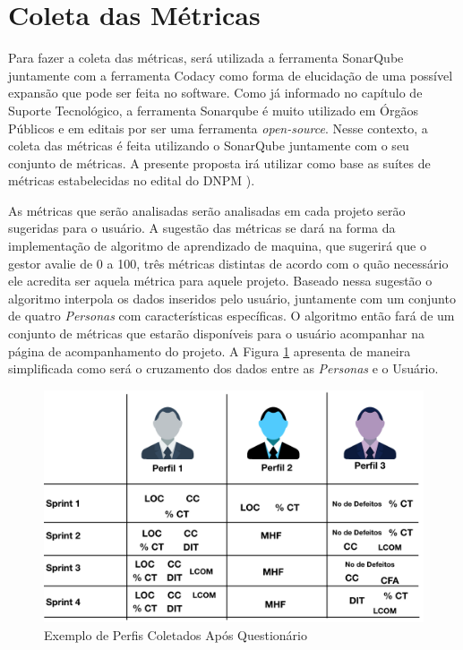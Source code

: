 \section{Coleta das Métricas}


Para fazer a coleta das métricas, será utilizada a ferramenta SonarQube juntamente com a ferramenta Codacy como forma de elucidação de uma possível expansão que pode ser feita no software. Como já informado no capítulo de Suporte Tecnológico, a ferramenta Sonarqube é muito utilizado em Órgãos Públicos e em editais por ser uma ferramenta \textit{open-source}. Nesse contexto, a coleta das métricas é feita utilizando o SonarQube juntamente com o seu conjunto de métricas. A presente proposta irá utilizar como base as suítes de métricas estabelecidas no edital do DNPM \cite{edital}).

As métricas que serão analisadas serão analisadas em cada projeto serão sugeridas para o usuário. A sugestão das métricas se dará na forma da implementação de algoritmo de aprendizado de maquina, que sugerirá que o gestor avalie de 0 a 100, três métricas distintas de acordo com o quão necessário ele acredita ser aquela métrica para aquele projeto. Baseado nessa sugestão o algoritmo interpola os dados inseridos pelo usuário, juntamente com um conjunto de quatro \textit{Personas} com características específicas. O algoritmo então fará de um conjunto de métricas que estarão disponíveis para o usuário acompanhar na página de acompanhamento do projeto. A Figura \ref{img:perfis} apresenta de maneira simplificada como será o cruzamento dos dados entre as \textit{Personas} e o Usuário.

\graphicspath{{figuras/}}
\begin{figure}[h!]
\centering
\includegraphics[scale=0.70]{perfis_exemplo.png}
\caption{Exemplo de Perfis Coletados Após Questionário}
\label{img:perfis}
\end{figure}


